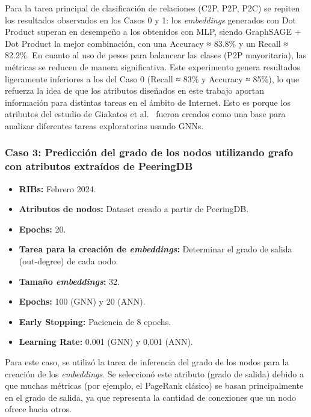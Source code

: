 Para la tarea principal de clasificación de relaciones (C2P, P2P, P2C) se repiten los resultados observados en los Casos 0 y 1: los \textit{embeddings} generados con Dot Product superan en desempeño a los obtenidos con MLP, siendo GraphSAGE + Dot Product la mejor combinación, con una Accuracy ≈ 83.8\% y un Recall ≈ 82.2\%. 
En cuanto al uso de pesos para balancear las clases (P2P mayoritaria), las métricas se reducen de manera significativa. Este experimento genera resultados ligeramente inferiores a los del Caso 0 (Recall ≈ 83\% y Accuracy ≈ 85\%), lo que refuerza la idea de que los atributos diseñados en este trabajo aportan información para distintas tareas en el ámbito de Internet. Esto es porque los atributos del estudio de Giakatos et al.~\cite{BenchmarkingGNN} fueron creados como una base para analizar diferentes tareas exploratorias usando GNNs.\\








\subsubsection{Caso 3: Predicción del grado de los nodos utilizando grafo con atributos extraídos de PeeringDB}

\begin{itemize}
    \item \textbf{RIBs:} Febrero 2024.
    \item \textbf{Atributos de nodos:} Dataset creado a partir de PeeringDB.
    \item \textbf{Epochs:} 20.
    \item \textbf{Tarea para la creación de \textit{embeddings}:} Determinar el grado de salida (out-degree) de cada nodo.
    \item \textbf{Tamaño \textit{embeddings}:} 32.
    \item \textbf{Epochs:} 100 (GNN) y 20 (ANN).
    \item \textbf{Early Stopping:} Paciencia de 8 epochs.
    \item \textbf{Learning Rate:} 0.001 (GNN) y 0,001 (ANN).
\end{itemize}

Para este caso, se utilizó la tarea de inferencia del grado de los nodos para la creación de los \textit{embeddings}. Se seleccionó este atributo (grado de salida) debido a que muchas métricas (por ejemplo, el PageRank clásico) se basan principalmente en el grado de salida, ya que representa la cantidad de conexiones que un nodo ofrece hacia otros.\\


